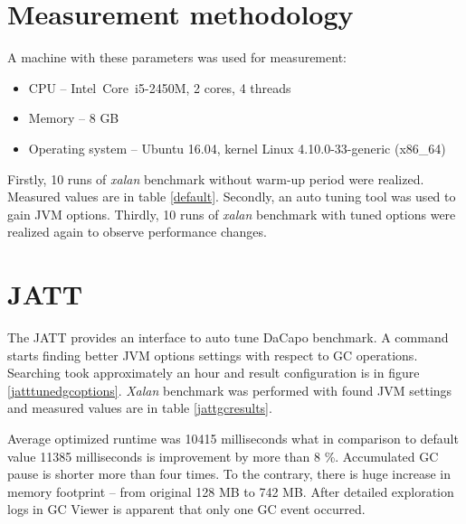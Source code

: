 \documentclass[
  digital, %
  oneside,
  notable, %
  nolof,     %
  nolot     %
]{fithesis3}
\begin{document}
\section{Measurement methodology}
A machine with these parameters was used for measurement:
\begin{itemize}
	\item CPU -- Intel\textregistered\ Core\texttrademark\ i5-2450M, 2 cores, 4 threads
	\item Memory -- 8 GB
	\item Operating system -- Ubuntu 16.04, kernel Linux 4.10.0-33-generic (x86\_64)
\end{itemize}

Firstly, 10 runs of \textit{xalan} benchmark without warm-up period were realized. Measured values are in table \ref{default}. Secondly, an auto tuning tool was used to gain JVM options. Thirdly, 10 runs of \textit{xalan} benchmark with tuned options were realized again to observe performance changes.


\section{JATT}
The JATT provides an interface to auto tune DaCapo benchmark. A command \texttt{} starts finding better JVM options settings with respect to GC operations. Searching took approximately an hour and result configuration is in figure \ref{jatttunedgcoptions}. \textit{Xalan} benchmark was performed with found JVM settings and measured values are in table \ref{jattgcresults}.

Average optimized runtime was 10415 milliseconds what in comparison to default value 11385 milliseconds is improvement by more than 8 \%. Accumulated GC pause is shorter more than four times. To the contrary, there is huge increase in memory footprint -- from original 128 MB to 742 MB. After detailed exploration logs in GC Viewer is apparent that only one GC event occurred.
\end{document}
